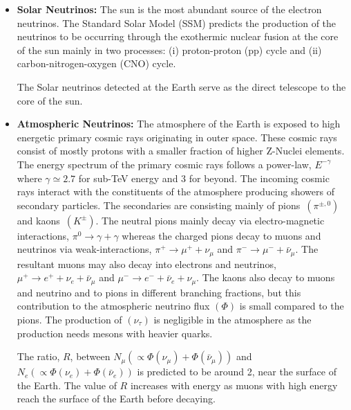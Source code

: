 \begin{itemize}
\item \textbf{Solar Neutrinos:} The sun is the most abundant source of
  the electron neutrinos. The Standard Solar Model (SSM)\cite{SSM}
  predicts the production of the neutrinos to be occurring through the
  exothermic nuclear fusion at the core of the sun mainly in two
  processes: (i) proton-proton (pp) cycle and
  (ii) carbon-nitrogen-oxygen (CNO) cycle.
  
  The Solar neutrinos detected at the Earth serve as the direct
  telescope to the core of the sun.
  
\item \textbf{Atmospheric Neutrinos:} The atmosphere of the Earth is
  exposed to high energetic primary cosmic rays originating in outer
  space. These cosmic rays consist of mostly protons with a smaller
  fraction of higher \mbox{Z-Nuclei} elements\cite{cosmic1}. The
  energy spectrum of the primary cosmic rays follows a power-law,
  $E^{-\gamma}$ where $\gamma\simeq 2.7$ for sub-TeV energy and 3 for
  beyond. The incoming cosmic rays interact with the constituents
  of the atmosphere producing showers of secondary particles.
  The secondaries are consisting mainly of
  \mbox{pions $\left(\pi^{\pm,0}\right)$} and
  \mbox{kaons $\left(K^{\pm}\right)$}. The neutral pions mainly decay
  via electro-magnetic interactions, $\pi^0 \rightarrow \gamma+\gamma$
  whereas the charged pions decay to muons and neutrinos via
  weak-interactions, $\pi^+ \rightarrow \mu^+ + \nu_{\mu}$ and
  $\pi^- \rightarrow \mu^- + \bar{\nu}_{\mu}$. The resultant muons may
  also decay into electrons and neutrinos,
  $\mu^+ \rightarrow e^+ + \nu_{e} + \bar{\nu}_{\mu}$ and
  $\mu^- \rightarrow e^- + \bar{\nu}_{e} + \nu_{\mu}$. The kaons also
  decay to muons and neutrino and to pions in different branching
  fractions, but this contribution to the atmospheric neutrino flux
  $\left(\Phi\right)$ is small compared to the pions. The production
  of $\left(\nu_{\tau}\right)$ is negligible in the atmosphere as the
  production needs mesons with heavier quarks.
  
  The ratio, $R$, between $N_{\mu}\left(\propto \Phi\left(\nu_{\mu}\right)+\Phi\left(\bar{\nu}_{\mu}\right)\right)$ and $N_{e}\left( \propto\Phi\left(\nu_{e}\right)+\Phi\left(\bar{\nu}_{e}\right)\right)$ is predicted to be around 2,
  near the surface of the Earth. The value of $R$ increases with
  energy as muons with high energy reach the surface of the Earth
  before decaying.
  

\end{itemize}
